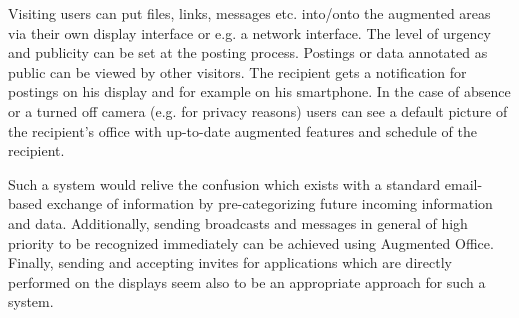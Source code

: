 Visiting users can put files, links, messages etc. into/onto the augmented areas via their own display interface or e.g. a network interface.
The level of urgency and publicity can be set at the posting process.
Postings or data annotated as public can be viewed by other visitors.
The recipient gets a notification for postings on his display and for example on his smartphone.
In the case of absence or a turned off camera (e.g. for privacy reasons) users can see a default picture of the recipient’s office with up-to-date augmented features and schedule of the recipient.

Such a system would relive the confusion which exists with a standard email-based exchange of information by pre-categorizing future incoming information and data.
Additionally, sending broadcasts and messages in general of high priority to be recognized immediately can be achieved using Augmented Office.
Finally, sending and accepting invites for applications which are directly performed on the displays seem also to be an appropriate approach for such a system. 

